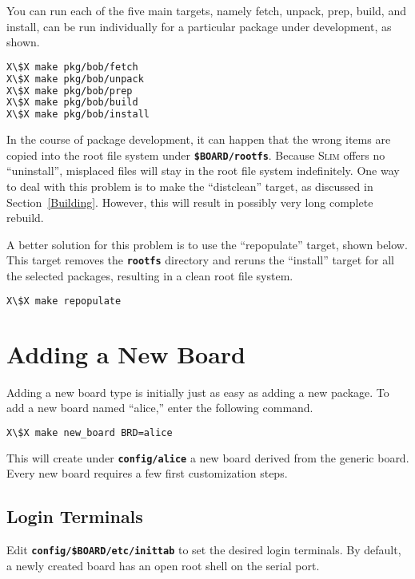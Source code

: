 \documentclass[a4paper,10pt]{article}
\newcommand{\slim}{\textsc{Slim}\xspace}
\newcommand{\fw}{\tt\bf}
\begin{document}
    You can run each of the five main targets, namely fetch, unpack,
    prep, build, and install, can be run individually for a particular
    package under development, as shown.

\begin{lstlisting}[language=bash,escapechar=X]
X\$X make pkg/bob/fetch
X\$X make pkg/bob/unpack
X\$X make pkg/bob/prep
X\$X make pkg/bob/build
X\$X make pkg/bob/install
\end{lstlisting}

    In the course of package development, it can happen that the wrong
    items are copied into the root file system under {\fw \$BOARD/rootfs}.
    Because \slim offers no ``uninstall'', misplaced files will stay
    in the root file system indefinitely. One way to deal with this
    problem is to make the ``distclean'' target, as discussed in
    Section~\ref{Building}. However, this will result in possibly very
    long complete rebuild.

    A better solution for this problem is to use the ``repopulate''
    target, shown below. This target removes the {\fw rootfs}
    directory and reruns the ``install'' target for all the selected
    packages, resulting in a clean root file system.

\begin{lstlisting}[language=bash,escapechar=X]
X\$X make repopulate
\end{lstlisting}

\section{Adding a New Board}

    Adding a new board type is initially just as easy as adding a new
    package. To add a new board named ``alice,'' enter the following
    command.

\begin{lstlisting}[language=bash,escapechar=X]
X\$X make new_board BRD=alice
\end{lstlisting}

   This will create under {\fw config/alice} a new board derived from
   the generic board. Every new board requires a few first
   customization steps.

\subsection{Login Terminals}

   Edit {\fw config/\$BOARD/etc/inittab} to set the desired login
   terminals. By default, a newly created board has an open root shell
   on the serial port.
\end{document}
